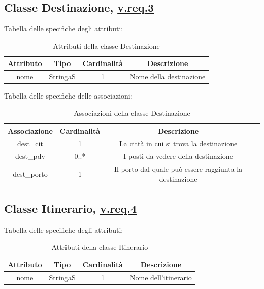 \documentclass{article}
\begin{document}
\subsection*{Classe Destinazione, \hyperref[sec:RequisitiDestinazione]{v.req.3}}\label{sec:Destinazione}

Tabella delle specifiche degli attributi:
\begin{table}[h!]
    \centering
    \begin{tabular}{|c|c|c|c|}
        \hline
        Attributo & Tipo & Cardinalità & Descrizione \\
        \hline
        nome & \hyperref[sec:StringaS]{StringaS} & 1 & Nome della destinazione \\
        \hline
    \end{tabular}
    \caption{Attributi della classe Destinazione}
\end{table}

Tabella delle specifiche delle associazioni:
\begin{table}[h!]
    \centering
    \begin{tabular}{|c|c|c|c|}
        \hline
        Associazione & Cardinalità & Descrizione \\
        \hline
        dest\_cit & 1 & La città in cui si trova la destinazione \\
        dest\_pdv & 0..* & I posti da vedere della destinazione \\
        dest\_porto & 1 & Il porto dal quale può essere raggiunta la destinazione \\
        \hline
    \end{tabular}
    \caption{Associazioni della classe Destinazione}
\end{table}
\subsection*{Classe Itinerario, \hyperref[sec:RequisitiItinerario]{v.req.4}}\label{sec:Itinerario}

Tabella delle specifiche degli attributi:
\begin{table}[h!]
    \centering
    \begin{tabular}{|c|c|c|c|}
        \hline
        Attributo & Tipo & Cardinalità & Descrizione \\
        \hline
        nome & \hyperref[sec:StringaS]{StringaS} & 1 & Nome dell'itinerario \\
        \hline
    \end{tabular}
    \caption{Attributi della classe Itinerario}
\end{table}
\end{document}
